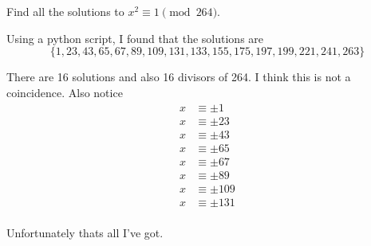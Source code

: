 \section{}

Find all the solutions to $x^2 \equiv 1 \pmod{264}$.

Using a python script, I found that the solutions are 
\[ \{1, 23, 43, 65, 67, 89, 109, 131, 133, 155, 175, 197, 199, 221, 241, 263\}
\]

There are 16 solutions and also 16 divisors of 264. I think this is not a
coincidence. Also notice
\begin{align*}
	x &\equiv \pm 1 \\
	x &\equiv \pm 23 \\
	x &\equiv \pm 43 \\
	x &\equiv \pm 65 \\
	x &\equiv \pm 67 \\
	x &\equiv \pm 89 \\
	x &\equiv \pm 109 \\
	x &\equiv \pm 131 \\
\end{align*}

Unfortunately thats all I've got.